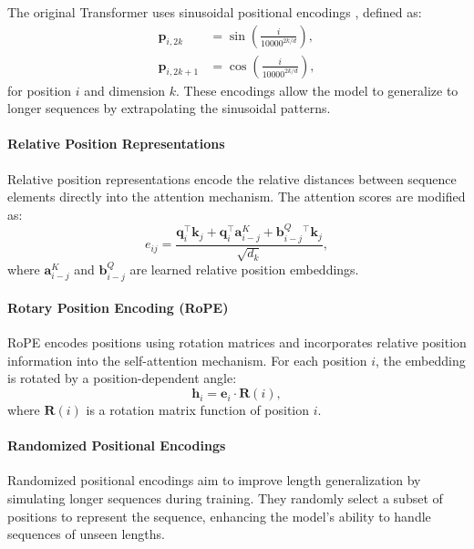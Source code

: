 The original Transformer uses sinusoidal positional encodings \cite{vaswani_attention_2017}, defined as:
\begin{align*}
    \mathbf{p}_{i,2k}   & = \sin\left( \frac{i}{10000^{2k/d}} \right), \\
    \mathbf{p}_{i,2k+1} & = \cos\left( \frac{i}{10000^{2k/d}} \right),
\end{align*}
for position $i$ and dimension $k$. These encodings allow the model to generalize to longer sequences by extrapolating the sinusoidal patterns.

\paragraph{Relative Position Representations}\label{subsec:relative_pos_rep}

Relative position representations \cite{shaw_self-attention_2018} encode the relative distances between sequence elements directly into the attention mechanism. The attention scores are modified as:
\begin{equation*}
    e_{ij} = \frac{\mathbf{q}_i^\top \mathbf{k}_j + \mathbf{q}_i^\top \mathbf{a}_{i-j}^K + \mathbf{b}_{i-j}^Q{}^\top \mathbf{k}_j}{\sqrt{d_k}},
\end{equation*}
where $\mathbf{a}_{i-j}^K$ and $\mathbf{b}_{i-j}^Q$ are learned relative position embeddings.

\paragraph{Rotary Position Encoding (RoPE)}\label{subsec:rope}

RoPE \cite{su_roformer_2024} encodes positions using rotation matrices and incorporates relative position information into the self-attention mechanism. For each position $i$, the embedding is rotated by a position-dependent angle:
\begin{equation*}
    \mathbf{h}_i = \mathbf{e}_i \cdot \mathbf{R}(i),
\end{equation*}
where $\mathbf{R}(i)$ is a rotation matrix function of position $i$.

\paragraph{Randomized Positional Encodings}\label{subsec:random_pos_enc}

Randomized positional encodings \cite{ruoss_randomized_2023} aim to improve length generalization by simulating longer sequences during training. They randomly select a subset of positions to represent the sequence, enhancing the model's ability to handle sequences of unseen lengths.

